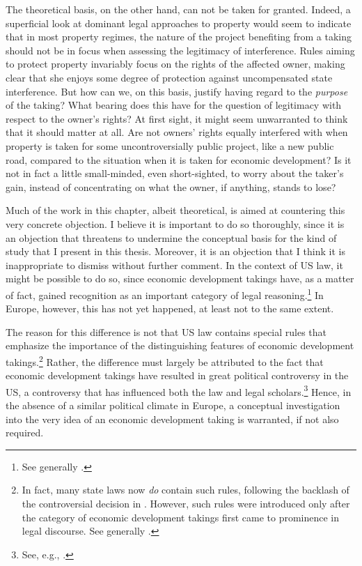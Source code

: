 The theoretical basis, on the other hand, can not be taken for granted. Indeed, a superficial look at dominant legal approaches to property would seem to indicate that in most property regimes, the nature of the project benefiting from a taking should not be in focus when assessing the legitimacy of interference. Rules aiming to protect property invariably focus on the rights of the affected owner, making clear that she enjoys some degree of protection against uncompensated state interference. But how can we, on this basis, justify having regard to the {\it purpose} of the taking? What bearing does this have for the question of legitimacy with respect to the owner's rights? At first sight, it might seem unwarranted to think that it should matter at all. Are not owners' rights  equally interfered with when property is taken for some uncontroversially public project, like a new public road, compared to the situation when it is taken for economic development? Is it not in fact a little small-minded, even short-sighted, to worry about the taker's gain, instead of concentrating on what the owner, if anything, stands to lose?

Much of the work in this chapter, albeit theoretical, is aimed at countering this very concrete objection. I believe it is important to do so thoroughly, since it is an objection that threatens to undermine the conceptual basis for the kind of study that I present in this thesis. Moreover, it is an objection that I think it is inappropriate to dismiss without further comment. In the context of US law, it might be possible to do so, since economic development takings have, as a matter of fact, gained recognition as an important category of legal reasoning.\footnote{See generally \cite{cohen06,somin07,malloy08}.}  In Europe, however, this has not yet happened, at least not to the same extent.

The reason for this difference is not that US law contains special rules that emphasize the importance of the distinguishing features of economic development takings.\footnote{In fact, many state laws now {\it do} contain such rules, following the backlash of the controversial decision in \cite{kelo05}. However, such rules were introduced only after the category of economic development takings first came to prominence in legal discourse. See generally \cite{eagle08,somin09,jacobs11}.} Rather, the difference must largely be attributed to the fact that economic development takings have resulted in great political controversy in the US, a controversy that has influenced both the law and legal scholars.\footnote{See, e.g., \cite[1190-1192]{somin08}.} Hence, in the absence of a similar political climate in Europe, a conceptual investigation into the very idea of an economic development taking is warranted, if not also required.

